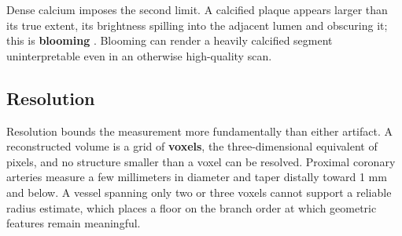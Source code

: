 Dense calcium imposes the second limit.
A calcified plaque appears larger than its true extent, its brightness spilling into the adjacent
lumen and obscuring it; this is \textbf{blooming} \cite{abbara2016scct}.
Blooming can render a heavily calcified segment uninterpretable even in an otherwise high-quality
scan.

\subsection{Resolution}

Resolution bounds the measurement more fundamentally than either artifact.
A reconstructed volume is a grid of \textbf{voxels}, the three-dimensional equivalent of pixels, and
no structure smaller than a voxel can be resolved.
Proximal coronary arteries measure a few millimeters in diameter and taper distally toward 1 mm and
below.
A vessel spanning only two or three voxels cannot support a reliable radius estimate, which
places a floor on the branch order at which geometric features remain meaningful.
